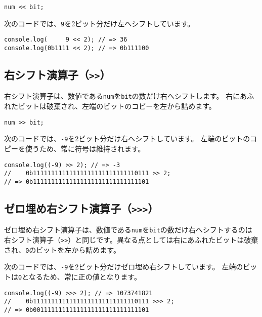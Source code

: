 \begin{lstlisting}
num << bit;
\end{lstlisting}

次のコードでは、\texttt{9}を2ビット分だけ左へシフトしています。

\begin{lstlisting}
console.log(     9 << 2); // => 36
console.log(0b1111 << 2); // => 0b111100
\end{lstlisting}

\hypertarget{right-shift}{%
\subsection{\texorpdfstring{右シフト演算子（\texttt{\textgreater{}\textgreater{}}）}{右シフト演算子（\textgreater{}\textgreater{}）}}\label{right-shift}}

右シフト演算子は、数値である\texttt{num}を\texttt{bit}の数だけ右へシフトします。
右にあふれたビットは破棄され、左端のビットのコピーを左から詰めます。

\begin{lstlisting}
num >> bit;
\end{lstlisting}

次のコードでは、\texttt{-9}を2ビット分だけ右へシフトしています。
左端のビットのコピーを使うため、常に符号は維持されます。

\begin{lstlisting}
console.log((-9) >> 2); // => -3
//    0b11111111111111111111111111110111 >> 2;
// => 0b11111111111111111111111111111101
\end{lstlisting}

\hypertarget{fill-zero-right-shift}{%
\subsection{\texorpdfstring{ゼロ埋め右シフト演算子（\texttt{\textgreater{}\textgreater{}\textgreater{}}）}{ゼロ埋め右シフト演算子（\textgreater{}\textgreater{}\textgreater{}）}}\label{fill-zero-right-shift}}

ゼロ埋め右シフト演算子は、数値である\texttt{num}を\texttt{bit}の数だけ右へシフトするのは右シフト演算子（\lstinline{>>}）と同じです。異なる点としては右にあふれたビットは破棄され、\texttt{0}のビットを左から詰めます。

次のコードでは、\texttt{-9}を2ビット分だけゼロ埋め右シフトしています。
左端のビットは\texttt{0}となるため、常に正の値となります。

\begin{lstlisting}
console.log((-9) >>> 2); // => 1073741821
//    0b11111111111111111111111111110111 >>> 2;
// => 0b00111111111111111111111111111101
\end{lstlisting}

